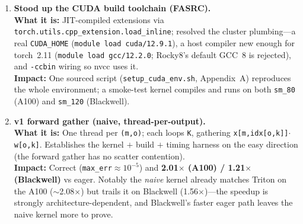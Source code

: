 \documentclass[11pt]{article}
\newcommand{\what}[1]{\textbf{What it is:} #1}
\newcommand{\impact}[1]{\textbf{Impact:} #1}
\begin{document}
\begin{center}
\end{center}

\begin{enumerate}[leftmargin=*, resume]

\item \textbf{Stood up the CUDA build toolchain (FASRC).}\\
\what{JIT-compiled extensions via \texttt{torch.utils.cpp\_extension.load\_inline}; resolved the
cluster plumbing---a real \texttt{CUDA\_HOME} (\texttt{module load cuda/12.9.1}), a host compiler
new enough for torch~2.11 (\texttt{module load gcc/12.2.0}; Rocky8's default GCC~8 is rejected),
and \texttt{-ccbin} wiring so nvcc uses it.}\\
\impact{One sourced script (\texttt{setup\_cuda\_env.sh}, Appendix~A) reproduces the whole
environment; a smoke-test kernel compiles and runs on both \texttt{sm\_80} (A100) and
\texttt{sm\_120} (Blackwell).}

\item \textbf{v1 forward gather (naive, thread-per-output).}\\
\what{One thread per \texttt{(m,o)}; each loops \texttt{K}, gathering
\texttt{x[m,idx[o,k]]$\cdot$w[o,k]}. Establishes the kernel $+$ build $+$ timing harness on the
easy direction (the forward gather has no scatter contention).}\\
\impact{Correct (\texttt{max\_err}$\approx$$10^{-5}$) and \textbf{2.01$\times$ (A100) /
1.21$\times$ (Blackwell)} vs eager. Notably the \emph{naive} kernel already matches Triton on the
A100 ($\sim$2.08$\times$) but trails it on Blackwell (1.56$\times$)---the speedup is strongly
architecture-dependent, and Blackwell's faster eager path leaves the naive kernel more to prove.}


\end{enumerate}
\end{document}
